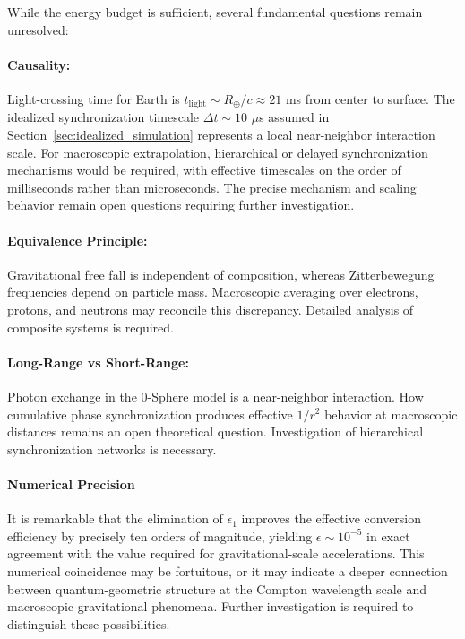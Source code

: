 \documentclass[%
 reprint,
 amsmath,amssymb,
 aps,
 prb,
]{revtex4-2}
\numberwithin{equation}{section}
\begin{document}
While the energy budget is sufficient, several fundamental questions remain unresolved:

\vspace{0.5cm}

\paragraph{Causality:}
Light-crossing time for Earth is $t_{\text{light}} \sim R_{\oplus}/c \approx 21$ ms from center to surface. The idealized synchronization timescale $\Delta t \sim 10$ $\mu$s assumed in Section~\ref{sec:idealized_simulation} represents a local near-neighbor interaction scale. For macroscopic extrapolation, hierarchical or delayed synchronization mechanisms would be required, with effective timescales on the order of milliseconds rather than microseconds. The precise mechanism and scaling behavior remain open questions requiring further investigation.

\vspace{0.5cm}

\paragraph{Equivalence Principle:}
Gravitational free fall is independent of composition, whereas Zitterbewegung frequencies depend on particle mass. Macroscopic averaging over electrons, protons, and neutrons may reconcile this discrepancy. Detailed analysis of composite systems is required.

\vspace{0.5cm}

\paragraph{Long-Range vs Short-Range:}
Photon exchange in the 0-Sphere model is a near-neighbor interaction. How cumulative phase synchronization produces effective $1/r^2$ behavior at macroscopic distances remains an open theoretical question. Investigation of hierarchical synchronization networks is necessary.

\vspace{0.5cm}

\paragraph{Numerical Precision}

It is remarkable that the elimination of $\epsilon_1$ improves the effective conversion efficiency by precisely ten orders of magnitude, yielding $\epsilon \sim 10^{-5}$ in exact agreement with the value required for gravitational-scale accelerations. This numerical coincidence may be fortuitous, or it may indicate a deeper connection between quantum-geometric structure at the Compton wavelength scale and macroscopic gravitational phenomena. Further investigation is required to distinguish these possibilities.
\end{document}
